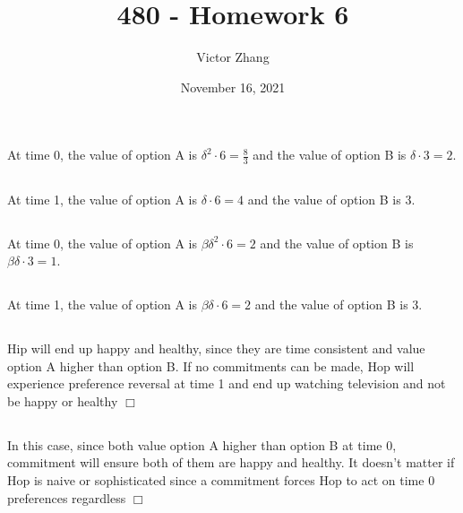 \documentclass{article}
\title{480 - Homework 6}
\author{Victor Zhang}
\date{November 16, 2021}
\begin{document}
\maketitle

\section{}
\subsection{}
At time 0, the value of option A is $\delta^2 \cdot 6 = \tfrac{8}{3}$ and the value of option B is $\delta \cdot 3 = 2$.

\subsection{}
At time 1, the value of option A is $\delta \cdot 6 = 4$ and the value of option B is 3.

\subsection{}
At time 0, the value of option A is $\beta\delta^2 \cdot 6 = 2$ and the value of option B is $\beta \delta \cdot 3 = 1$.

\subsection{}
At time 1, the value of option A is $\beta \delta \cdot 6 = 2$ and the value of option B is 3.

\subsection{}
Hip will end up happy and healthy, since they are time consistent and value option A higher than option B. If no commitments can be made, Hop will experience preference reversal at time 1 and end up watching television and not be happy or healthy $\Box$

\subsection{}
In this case, since both value option A higher than option B at time 0, commitment will ensure both of them are happy and healthy. It doesn't matter if Hop is naive or sophisticated since a commitment forces Hop to act on time 0 preferences regardless $\Box$
\end{document}
